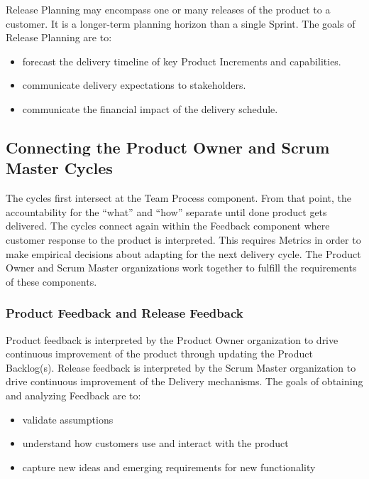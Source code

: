 \documentclass[12pt,a4paper,parskip=full]{scrartcl}
\begin{document}
Release Planning may encompass one or many releases of the product to a customer. It is a longer-term planning horizon than a single Sprint. The goals of Release Planning are to:

\begin{itemize}
\itemsep1pt\parskip0pt
\item
  forecast the delivery timeline of key Product Increments and
  capabilities.
\item
  communicate delivery expectations to stakeholders.
\item
  communicate the financial impact of the delivery schedule.
\end{itemize}

\subsection{Connecting the Product Owner and Scrum Master
Cycles}\label{Connecting-the-product-owner-and-scrum-master-cycles}

The cycles first intersect at the Team Process component. From that point, the accountability for the ``what'' and ``how'' separate until done product gets delivered. The cycles connect again within the Feedback component where customer response to the product is interpreted. This requires Metrics in order to make empirical decisions about adapting for the next delivery cycle. The Product Owner and Scrum Master organizations work together to fulfill the requirements of these components.

\subsubsection{Product Feedback and Release
Feedback}\label{product-feedback-and-release-feedback}

Product feedback is interpreted by the Product Owner organization to drive continuous improvement of the product through updating the Product Backlog(s). Release feedback is interpreted by the Scrum Master organization to drive continuous improvement of the Delivery mechanisms. The goals of obtaining and analyzing Feedback are to:

\begin{itemize}
\itemsep1pt\parskip0pt
\item
  validate assumptions
\item
  understand how customers use and interact with the product
\item
  capture new ideas and emerging requirements for new functionality
\end{itemize}
\end{document}
